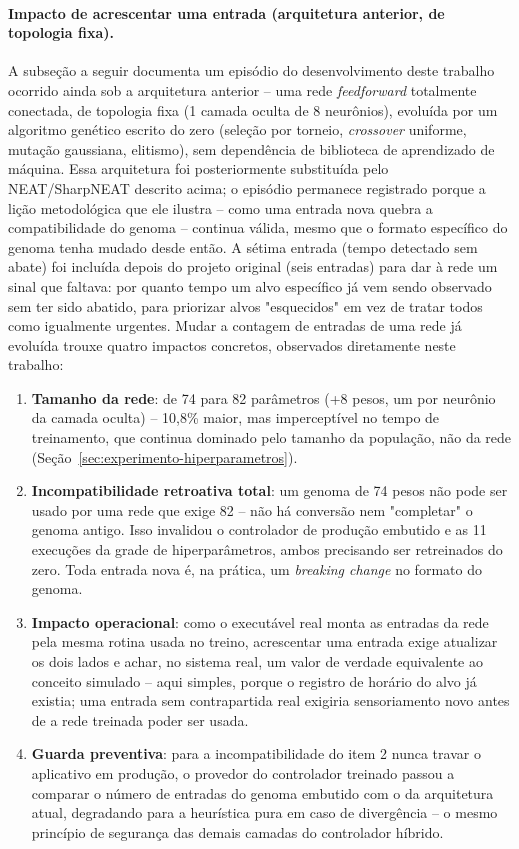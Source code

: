 \documentclass[12pt,a4paper]{article}
\begin{document}
\paragraph{Impacto de acrescentar uma entrada (arquitetura anterior, de topologia fixa).}
A subseção a seguir documenta um episódio do desenvolvimento deste trabalho ocorrido ainda sob a
arquitetura anterior -- uma rede \textit{feedforward} totalmente conectada, de topologia fixa
(1 camada oculta de 8 neurônios), evoluída por um algoritmo genético escrito do zero (seleção por
torneio, \textit{crossover} uniforme, mutação gaussiana, elitismo), sem dependência de biblioteca
de aprendizado de máquina. Essa arquitetura foi posteriormente substituída pelo NEAT/SharpNEAT
descrito acima; o episódio permanece registrado porque a lição metodológica que ele ilustra --
como uma entrada nova quebra a compatibilidade do genoma -- continua válida, mesmo que o formato
específico do genoma tenha mudado desde então. A sétima entrada (tempo detectado sem abate) foi
incluída depois do projeto original (seis entradas) para dar à rede um sinal que faltava: por
quanto tempo um alvo específico já vem sendo observado sem ter sido abatido, para priorizar alvos
"esquecidos" em vez de tratar todos como igualmente urgentes. Mudar a contagem de entradas de uma
rede já evoluída trouxe quatro impactos concretos, observados diretamente neste trabalho:

\begin{enumerate}
  \item \textbf{Tamanho da rede}: de 74 para 82 parâmetros (+8 pesos, um por neurônio da camada
  oculta) -- 10,8\% maior, mas imperceptível no tempo de treinamento, que continua dominado pelo
  tamanho da população, não da rede (Seção~\ref{sec:experimento-hiperparametros}).
  \item \textbf{Incompatibilidade retroativa total}: um genoma de 74 pesos não pode ser usado por
  uma rede que exige 82 -- não há conversão nem "completar" o genoma antigo. Isso invalidou o
  controlador de produção embutido e as 11 execuções da grade de hiperparâmetros, ambos
  precisando ser retreinados do zero. Toda entrada nova é, na prática, um \textit{breaking change}
  no formato do genoma.
  \item \textbf{Impacto operacional}: como o executável real monta as entradas da rede pela mesma
  rotina usada no treino, acrescentar uma entrada exige atualizar os dois lados e achar, no sistema
  real, um valor de verdade equivalente ao conceito simulado -- aqui simples, porque o registro de
  horário do alvo já existia; uma entrada sem contrapartida real exigiria sensoriamento novo antes
  de a rede treinada poder ser usada.
  \item \textbf{Guarda preventiva}: para a incompatibilidade do item 2 nunca travar o aplicativo em
  produção, o provedor do controlador treinado passou a comparar o número de entradas do genoma
  embutido com o da arquitetura atual, degradando para a heurística pura em caso de divergência --
  o mesmo princípio de segurança das demais camadas do controlador híbrido.
\end{enumerate}
\end{document}
